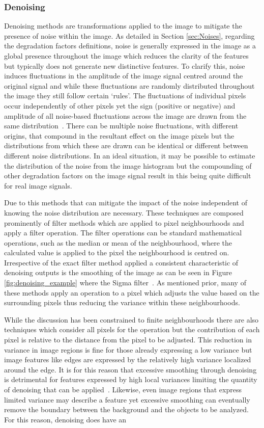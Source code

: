 \subsubsection{Denoising}
Denoising methods are transformations applied to the image to mitigate the presence of noise within the image. As detailed in Section \ref{sec:Noises}, regarding the degradation factors definitions, noise is generally expressed in the image as a global presence throughout the image which reduces the clarity of the features but typically does not generate new distinctive features. To clarify this, noise induces fluctuations in the amplitude of the image signal centred around the original signal and while these fluctuations are randomly distributed throughout the image they still follow certain `rules'. The fluctuations of individual pixels occur independently of other pixels yet the sign (positive or negative) and amplitude of all noise-based fluctuations across the image are drawn from the same distribution~\cite{bioimage_book}. There can be multiple noise fluctuations, with different origins, that compound in the resultant effect on the image pixels but the distributions from which these are drawn can be identical or different between different noise distributions. In an ideal situation, it may be possible to estimate the distribution of the noise from the image histogram but the compounding of other degradation factors on the image signal result in this being quite difficult for real image signals.\par Due to this methods that can mitigate the impact of the noise independent of knowing the noise distribution are necessary. These techniques are composed prominently of filter methods which are applied to pixel neighbourhoods and apply a filter operation. The filter operations can be standard mathematical operations, such as the median or mean of the neighbourhood, where the calculated value is applied to the pixel the neighbourhood is centred on. Irrespective of the exact filter method applied a consistent characteristic of denoising outputs is the smoothing of the image as can be seen in Figure \ref{fig:denoising_example} where the Sigma filter~\cite{sigma_filter}. As mentioned prior, many of these methods apply an operation to a pixel which adjusts the value based on the surrounding pixels thus reducing the variance within these neighbourhoods.\par While the discussion has been constrained to finite neighbourhoods there are also techniques which consider all pixels for the operation but the contribution of each pixel is relative to the distance from the pixel to be adjusted. This reduction in variance in image regions is fine for those already expressing a low variance but image features like edges are expressed by the relatively high variance localized around the edge. It is for this reason that excessive smoothing through denoising is detrimental for features expressed by high local variances limiting the quantity of denoising that can be applied~\cite{sigma_filter}. Likewise, even image regions that express limited variance may describe a feature yet excessive smoothing can eventually remove the boundary between the background and the objects to be analyzed. For this reason, denoising does have an 